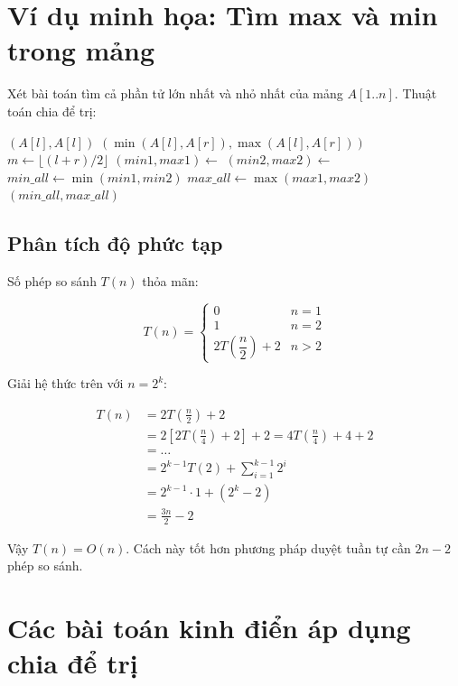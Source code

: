 \documentclass{article}
\begin{document}
\section{Ví dụ minh họa: Tìm max và min trong mảng}

Xét bài toán tìm cả phần tử lớn nhất và nhỏ nhất của mảng \(A[1..n]\). Thuật toán chia để trị:

\begin{algorithmic}[1]
     
        \State \Return $(A[l], A[l])$
     
        \State \Return $(\min(A[l], A[r]), \max(A[l], A[r]))$
    \Else
        \State $m \gets \lfloor (l+r)/2 \rfloor$
        \State $(min1, max1) \gets$ 
        \State $(min2, max2) \gets$ 
        \State $min\_all \gets \min(min1, min2)$
        \State $max\_all \gets \max(max1, max2)$
        \State \Return $(min\_all, max\_all)$
    \EndIf
\EndFunction
\end{algorithmic}

\subsection{Phân tích độ phức tạp}

Số phép so sánh \(T(n)\) thỏa mãn:

\[
T(n) = 
\begin{cases}
0 & n = 1 \\
1 & n = 2 \\
2T\left(\dfrac{n}{2}\right) + 2 & n > 2
\end{cases}
\]

Giải hệ thức trên với \(n = 2^k\):

\[
\begin{aligned}
T(n) &= 2T\left(\frac{n}{2}\right) + 2 \\
&= 2\left[2T\left(\frac{n}{4}\right) + 2\right] + 2 = 4T\left(\frac{n}{4}\right) + 4 + 2 \\
&= \dots \\
&= 2^{k-1}T(2) + \sum_{i=1}^{k-1} 2^i \\
&= 2^{k-1}\cdot 1 + (2^k - 2) \\
&= \frac{3n}{2} - 2
\end{aligned}
\]

Vậy \(T(n) = O(n)\). Cách này tốt hơn phương pháp duyệt tuần tự cần \(2n-2\) phép so sánh.

\section{Các bài toán kinh điển áp dụng chia để trị}
\end{document}
